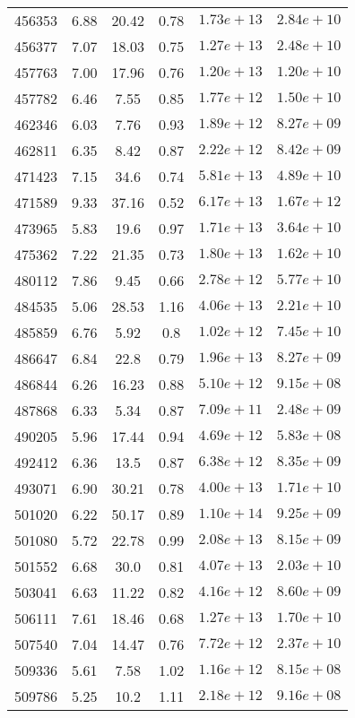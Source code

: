 \begin{table}
\begin{tabular}{cccccc}
456353 & 6.88 & 20.42 & 0.78 & $1.73e+13$ & $2.84e+10$ \\
456377 & 7.07 & 18.03 & 0.75 & $1.27e+13$ & $2.48e+10$ \\
457763 & 7.00 & 17.96 & 0.76 & $1.20e+13$ & $1.20e+10$ \\
457782 & 6.46 & 7.55 & 0.85 & $1.77e+12$ & $1.50e+10$ \\
462346 & 6.03 & 7.76 & 0.93 & $1.89e+12$ & $8.27e+09$ \\
462811 & 6.35 & 8.42 & 0.87 & $2.22e+12$ & $8.42e+09$ \\
471423 & 7.15 & 34.6 & 0.74 & $5.81e+13$ & $4.89e+10$ \\
471589 & 9.33 & 37.16 & 0.52 & $6.17e+13$ & $1.67e+12$ \\
473965 & 5.83 & 19.6 & 0.97 & $1.71e+13$ & $3.64e+10$ \\
475362 & 7.22 & 21.35 & 0.73 & $1.80e+13$ & $1.62e+10$ \\
480112 & 7.86 & 9.45 & 0.66 & $2.78e+12$ & $5.77e+10$ \\
484535 & 5.06 & 28.53 & 1.16 & $4.06e+13$ & $2.21e+10$ \\
485859 & 6.76 & 5.92 & 0.8 & $1.02e+12$ & $7.45e+10$ \\
486647 & 6.84 & 22.8 & 0.79 & $1.96e+13$ & $8.27e+09$ \\
486844 & 6.26 & 16.23 & 0.88 & $5.10e+12$ & $9.15e+08$ \\
487868 & 6.33 & 5.34 & 0.87 & $7.09e+11$ & $2.48e+09$ \\
490205 & 5.96 & 17.44 & 0.94 & $4.69e+12$ & $5.83e+08$ \\
492412 & 6.36 & 13.5 & 0.87 & $6.38e+12$ & $8.35e+09$ \\
493071 & 6.90 & 30.21 & 0.78 & $4.00e+13$ & $1.71e+10$ \\
501020 & 6.22 & 50.17 & 0.89 & $1.10e+14$ & $9.25e+09$ \\
501080 & 5.72 & 22.78 & 0.99 & $2.08e+13$ & $8.15e+09$ \\
501552 & 6.68 & 30.0 & 0.81 & $4.07e+13$ & $2.03e+10$ \\
503041 & 6.63 & 11.22 & 0.82 & $4.16e+12$ & $8.60e+09$ \\
506111 & 7.61 & 18.46 & 0.68 & $1.27e+13$ & $1.70e+10$ \\
507540 & 7.04 & 14.47 & 0.76 & $7.72e+12$ & $2.37e+10$ \\
509336 & 5.61 & 7.58 & 1.02 & $1.16e+12$ & $8.15e+08$ \\
509786 & 5.25 & 10.2 & 1.11 & $2.18e+12$ & $9.16e+08$ \\

\end{tabular}
\end{table}

